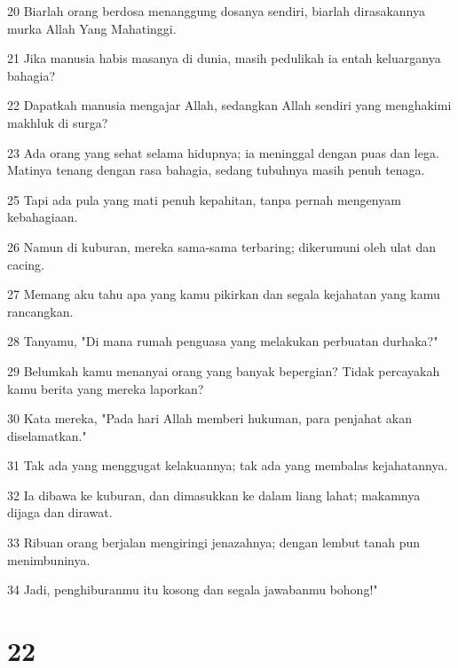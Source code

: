 \par 20 Biarlah orang berdosa menanggung dosanya sendiri, biarlah dirasakannya murka Allah Yang Mahatinggi.
\par 21 Jika manusia habis masanya di dunia, masih pedulikah ia entah keluarganya bahagia?
\par 22 Dapatkah manusia mengajar Allah, sedangkan Allah sendiri yang menghakimi makhluk di surga?
\par 23 Ada orang yang sehat selama hidupnya; ia meninggal dengan puas dan lega. Matinya tenang dengan rasa bahagia, sedang tubuhnya masih penuh tenaga.
\par 25 Tapi ada pula yang mati penuh kepahitan, tanpa pernah mengenyam kebahagiaan.
\par 26 Namun di kuburan, mereka sama-sama terbaring; dikerumuni oleh ulat dan cacing.
\par 27 Memang aku tahu apa yang kamu pikirkan dan segala kejahatan yang kamu rancangkan.
\par 28 Tanyamu, "Di mana rumah penguasa yang melakukan perbuatan durhaka?"
\par 29 Belumkah kamu menanyai orang yang banyak bepergian? Tidak percayakah kamu berita yang mereka laporkan?
\par 30 Kata mereka, "Pada hari Allah memberi hukuman, para penjahat akan diselamatkan."
\par 31 Tak ada yang menggugat kelakuannya; tak ada yang membalas kejahatannya.
\par 32 Ia dibawa ke kuburan, dan dimasukkan ke dalam liang lahat; makamnya dijaga dan dirawat.
\par 33 Ribuan orang berjalan mengiringi jenazahnya; dengan lembut tanah pun menimbuninya.
\par 34 Jadi, penghiburanmu itu kosong dan segala jawabanmu bohong!"

\chapter{22}

